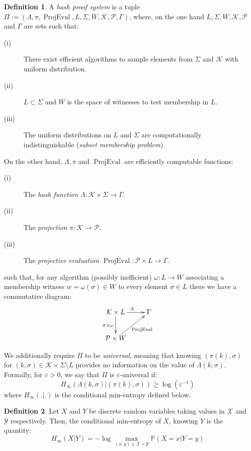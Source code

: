 \documentclass[a4paper,10pt]{report}
\theoremstyle{definition}
\newtheorem{definition}{Definition}[chapter]
\theoremstyle{plain}
\theoremstyle{definition}
\newcommand{\m}[1]{\mathcal{#1}}
\renewcommand{\(}{\left(}
\renewcommand{\)}{\right)}
\renewcommand{\P}{\mathbb{P}}
\DeclareMathOperator{\ProjEval}{ProjEval}
\begin{document}
\begin{definition}
A \emph{hash proof system} is a tuple $\Pi:=(\Lambda,\pi,\ProjEval,L,\Sigma,W,\m{K},\m{P},\Gamma)$, where, on the one hand $L,\Sigma,W,\m{K},\m{P}$ and $\Gamma$ are sets such that:
\begin{description}
\item[(i)] There exist efficient algorithms to sample elements from $\Sigma$ and $\m{K}$ with uniform distribution.
\item[(ii)] $L\subset \Sigma$ and $W$ is the space of witnesses to test membership in $L$.
\item[(iii)]  The uniform distributions on $L$ and $\Sigma$ are computationally indistinguishable (\emph{subset membership problem}).
\end{description}

On the other hand, $\Lambda,\pi$ and $\ProjEval$ are efficiently computable functions:
\begin{description}
\item[(i)] The \emph{hash function} $\Lambda: \m{K}\times\Sigma\longrightarrow \Gamma$.
\item[(ii)] The \emph{projection} $\pi: \m{K}\longrightarrow \m{P}$.
\item[(iii)] The \emph{projective evaluation} $\ProjEval: \m{P}\times L\longrightarrow \Gamma$.
\end{description}
such that, for any algorithm (possibly inefficient) $\omega : L\longrightarrow W$ associating a membership witness $w=\omega(\sigma)\in W$ to every element $\sigma\in L$ there we have a commutative diagram:
\[
\xymatrix{
\m{K}\times L  \ar[r]^{\Lambda} \ar[d]_{\pi\times\omega} & \Gamma\\
\m{P}\times W \ar[ru]_{\ProjEval} &
}
\]

We additionally require $\Pi$ to be \emph{universal}, meaning that knowing $(\pi(k),\sigma)$ for $(k,\sigma)\in \m{K}\times \Sigma\setminus L$ provides no information on the value of $\Lambda(k,\sigma)$. Formally, for $\varepsilon>0$, we say that $\Pi$ is $\varepsilon$-universal if:
\[H_\infty(\Lambda(k,\sigma)|(\pi(k),\sigma))\geq\log(\varepsilon^{-1})\]
where $H_\infty(.|.)$ is the conditional min-entropy defined below.
\end{definition}

\begin{definition}
Let $X$ and $Y$ be discrete random variables taking values in $\m{X}$ and $\m{Y}$ respectively. Then, the conditional min-entropy of $X$, knowing $Y$ is the quantity:
\[H_\infty(X|Y)=-\log\max_{(x,y)\in\m{X}\times\m{Y}}\P(X=x|Y=y)\]
\end{definition}
\end{document}

